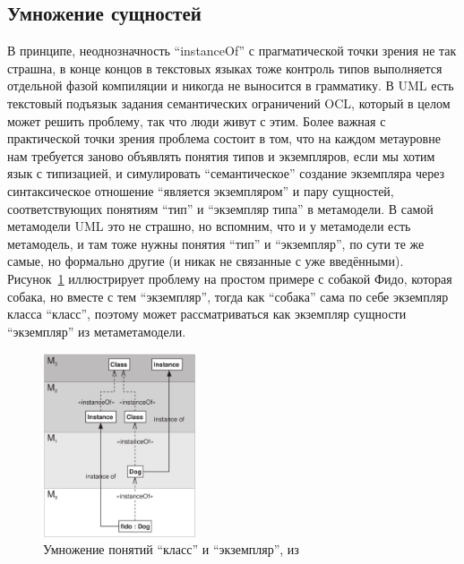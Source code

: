 \documentclass[a5paper]{article}
\begin{document}
\subsection{Умножение сущностей}

В принципе, неоднозначность ``instanceOf'' с прагматической точки зрения не так страшна, в конце концов в текстовых языках тоже контроль типов выполняется отдельной фазой компиляции и никогда не выносится в грамматику. В UML есть текстовый подъязык задания семантических ограничений OCL, который в целом может решить проблему, так что люди живут с этим. Более важная с практической точки зрения проблема состоит в том, что на каждом метауровне нам требуется заново объявлять понятия типов и экземпляров, если мы хотим язык с типизацией, и симулировать ``семантическое'' создание экземпляра через синтаксическое отношение ``является экземпляром'' и пару сущностей, соответствующих понятиям ``тип'' и ``экземпляр типа'' в метамодели. В самой метамодели UML это не страшно, но вспомним, что и у метамодели есть метамодель, и там тоже нужны понятия ``тип'' и ``экземпляр'', по сути те же самые, но формально другие (и никак не связанные с уже введёнными). Рисунок~\ref{figure:atkinsonDuplication} иллюстрирует проблему на простом примере с собакой Фидо, которая собака, но вместе с тем ``экземпляр'', тогда как ``собака'' сама по себе экземпляр класса ``класс'', поэтому может рассматриваться как экземпляр сущности ``экземпляр'' из метаметамодели.

\begin{figure}
	\begin{center}
		\includegraphics[width=0.4\textwidth]{atkinsonDuplication.png}
	\end{center}
	\caption{Умножение понятий ``класс'' и ``экземпляр'', из~\cite{atkinson2001multilevel}}
	\label{figure:atkinsonDuplication}
\end{figure}
\end{document}
